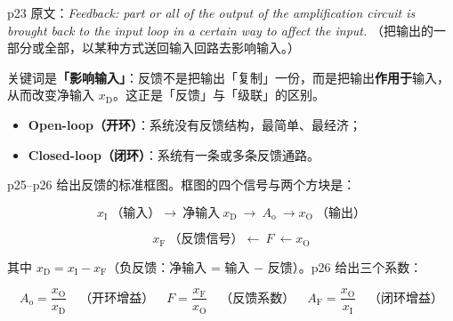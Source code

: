 \documentclass[11pt]{ctexart}
\begin{document}



p23 原文：\textit{Feedback: part or all of the output of the amplification circuit is brought back
to the input loop in a certain way to affect the input.}
（把输出的一部分或全部，以某种方式送回输入回路去影响输入。）

关键词是\textbf{「影响输入」}：反馈不是把输出「复制」一份，而是把输出\textbf{作用于}输入，
从而改变净输入 $x_{\mathrm{D}}$。这正是「反馈」与「级联」的区别。


\begin{itemize}
\item \textbf{Open-loop（开环）}：系统没有反馈结构，最简单、最经济；
\item \textbf{Closed-loop（闭环）}：系统有一条或多条反馈通路。
\end{itemize}


p25--p26 给出反馈的标准框图。框图的四个信号与两个方块是：

\[
x_{\mathrm{I}}\ \text{（输入）}\longrightarrow\boxed{\ \text{净输入}\ x_{\mathrm{D}}\ }
\longrightarrow\boxed{\ A_{\mathrm{o}}\ }\longrightarrow x_{\mathrm{O}}\ \text{（输出）}
\]

\[
x_{\mathrm{F}}\ \text{（反馈信号）}\longleftarrow\boxed{\ F\ }
\longleftarrow x_{\mathrm{O}}
\]

其中 $x_{\mathrm{D}}=x_{\mathrm{I}}-x_{\mathrm{F}}$（负反馈：净输入 = 输入 − 反馈）。p26 给出三个系数：

\[
\boxed{\;A_{\mathrm{o}}=\frac{x_{\mathrm{O}}}{x_{\mathrm{D}}}\quad\text{（开环增益）}\quad
F=\frac{x_{\mathrm{F}}}{x_{\mathrm{O}}}\quad\text{（反馈系数）}\quad
A_{\mathrm{F}}=\frac{x_{\mathrm{O}}}{x_{\mathrm{I}}}\quad\text{（闭环增益）}\;}
\]

\end{document}
